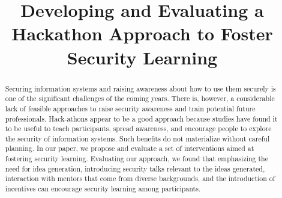 \documentclass[runningheads]{llncs}
\begin{document}
%
\title{Developing and Evaluating a Hackathon Approach to Foster Security Learning}
%
%

%
\authorrunning{}
%
\maketitle              %
%
\begin{abstract}
Securing information systems and raising awareness about how to use them securely is one of the significant challenges of the coming years. There is, however, a considerable lack of feasible approaches to raise security awareness and train potential future professionals. Hack-athons appear to be a good approach because studies have found it to be useful to teach participants, spread awareness, and encourage people to explore the security of information systems. Such benefits do not materialize without careful planning. In our paper, we propose and evaluate a set of interventions aimed at fostering security learning.
Evaluating our approach, we found that emphasizing the need for idea generation, introducing security talks relevant to the ideas generated, interaction with mentors that come from diverse backgrounds, and the introduction of incentives can encourage security learning among participants.
\end{abstract}
%
%
\end{document}
